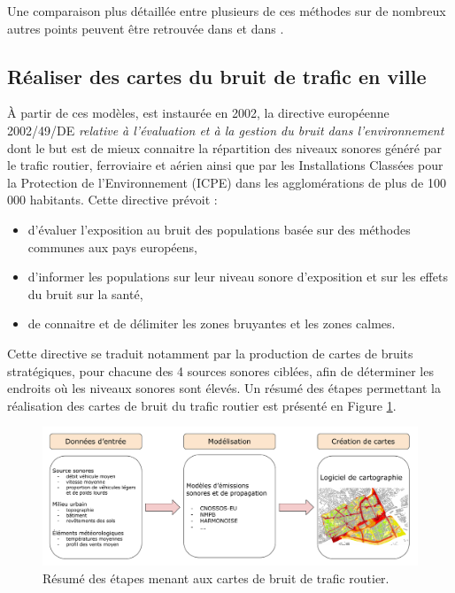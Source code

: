 Une comparaison plus détaillée entre plusieurs de ces méthodes sur de nombreux autres points peuvent être retrouvée dans \cite{steele_critical_2001} et dans \cite{garg_critical_2014}.

\subsection{Réaliser des cartes du bruit de trafic en ville}

À partir de ces modèles, est instaurée en 2002, la directive européenne 2002/49/DE \textit{relative à l'évaluation et à la gestion du bruit dans l'environnement} dont le but est de mieux connaitre la répartition des niveaux sonores généré par le trafic routier, ferroviaire et aérien ainsi que par les Installations Classées pour la Protection de l'Environnement (ICPE) dans les agglomérations de plus de 100 000 habitants. Cette directive prévoit :

\begin{itemize}
	\item d'évaluer l'exposition au bruit des populations basée sur des méthodes communes aux pays européens,
	\item d'informer les populations sur leur niveau sonore d'exposition et sur les effets du bruit sur la santé,
	\item de connaitre et de délimiter les zones bruyantes et les zones calmes.\\
\end{itemize}

Cette directive se traduit notamment par la production de cartes de bruits stratégiques, pour chacune des 4 sources sonores ciblées, afin de déterminer les endroits où les niveaux sonores sont élevés. Un résumé des étapes permettant la réalisation des cartes de bruit du trafic routier est présenté en Figure \ref{fig:cartographie}.\\


\begin{figure}[h]
\centering
\includegraphics[width=.85\linewidth]{./figures/cartographie/cartographie.pdf}
\caption{Résumé des étapes menant aux cartes de bruit de trafic routier.}
\label{fig:cartographie}
\end{figure}

